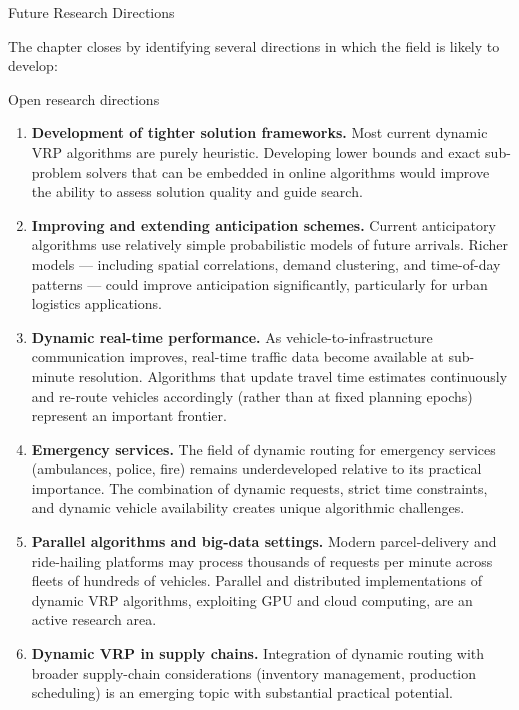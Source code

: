 \documentclass[aspectratio=169,10pt]{beamer}
\begin{document}
\begin{frame}[allowframebreaks]{Future Research Directions}

  The chapter closes by identifying several directions in which the field
  is likely to develop:

  \begin{block}{Open research directions}
    \begin{enumerate}
      \item \textbf{Development of tighter solution frameworks.}
            Most current dynamic VRP algorithms are purely heuristic.
            Developing lower bounds and exact sub-problem solvers that can
            be embedded in online algorithms would improve the ability to
            assess solution quality and guide search.

      \item \textbf{Improving and extending anticipation schemes.}
            Current anticipatory algorithms use relatively simple probabilistic
            models of future arrivals.  Richer models — including spatial
            correlations, demand clustering, and time-of-day patterns —
            could improve anticipation significantly, particularly for urban
            logistics applications.

      \item \textbf{Dynamic real-time performance.}
            As vehicle-to-infrastructure communication improves, real-time
            traffic data become available at sub-minute resolution.
            Algorithms that update travel time estimates continuously and
            re-route vehicles accordingly (rather than at fixed planning
            epochs) represent an important frontier.

      \item \textbf{Emergency services.}
            The field of dynamic routing for emergency services (ambulances,
            police, fire) remains underdeveloped relative to its practical
            importance.  The combination of dynamic requests, strict time
            constraints, and dynamic vehicle availability creates unique
            algorithmic challenges.

      \item \textbf{Parallel algorithms and big-data settings.}
            Modern parcel-delivery and ride-hailing platforms may process
            thousands of requests per minute across fleets of hundreds of
            vehicles.  Parallel and distributed implementations of dynamic
            VRP algorithms, exploiting GPU and cloud computing, are an active
            research area.

      \item \textbf{Dynamic VRP in supply chains.}
            Integration of dynamic routing with broader supply-chain
            considerations (inventory management, production scheduling) is
            an emerging topic with substantial practical potential.
    \end{enumerate}
  \end{block}

\end{frame}
\end{document}
